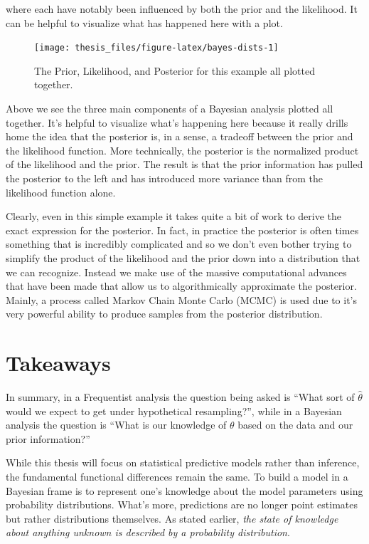 \documentclass[12pt,twoside]{reedthesis}
\begin{document}
where each have notably been influenced by both the prior and the likelihood. It can be helpful to visualize what has happened here with a plot.
\begin{figure}

{\centering \texttt{[image: thesis\_files/figure-latex/bayes-dists-1]} 

}

\caption{The Prior, Likelihood, and Posterior for this example all plotted together.}\label{fig:bayes-dists}
\end{figure}
Above we see the three main components of a Bayesian analysis plotted all together. It's helpful to visualize what's happening here because it really drills home the idea that the posterior is, in a sense, a tradeoff between the prior and the likelihood function. More technically, the posterior is the normalized product of the likelihood and the prior. The result is that the prior information has pulled the posterior to the left and has introduced more variance than from the likelihood function alone.

Clearly, even in this simple example it takes quite a bit of work to derive the exact expression for the posterior. In fact, in practice the posterior is often times something that is incredibly complicated and so we don't even bother trying to simplify the product of the likelihood and the prior down into a distribution that we can recognize. Instead we make use of the massive computational advances that have been made that allow us to algorithmically approximate the posterior. Mainly, a process called Markov Chain Monte Carlo (MCMC) is used due to it's very powerful ability to produce samples from the posterior distribution.

\hypertarget{takeaways}{%
\section{Takeaways}\label{takeaways}}

In summary, in a Frequentist analysis the question being asked is ``What sort of \(\hat{\theta}\) would we expect to get under hypothetical resampling?'', while in a Bayesian analysis the question is ``What is our knowledge of \(\theta\) based on the data and our prior information?''

While this thesis will focus on statistical predictive models rather than inference, the fundamental functional differences remain the same. To build a model in a Bayesian frame is to represent one's knowledge about the model parameters using probability distributions. What's more, predictions are no longer point estimates but rather distributions themselves. As stated earlier, \emph{the state of knowledge about anything unknown is described by a probability distribution}.
\end{document}
